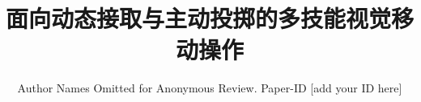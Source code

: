 \documentclass[conference]{IEEEtran}
\begin{document}
\title{面向动态接取与主动投掷的多技能视觉移动操作}
\author{Author Names Omitted for Anonymous Review. Paper-ID [add your ID here]}
\maketitle


\IEEEpeerreviewmaketitle





\end{document}
